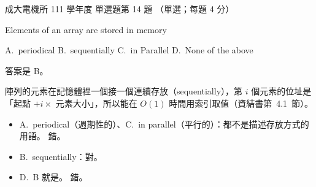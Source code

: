 \begin{pastexam}[label={px:ncku-111-ee-ds-14}]{成大電機所 111 學年度 單選題第 14 題}
（單選；每題 4 分）

Elements of an array are stored \underline{\hspace{3em}} in memory

A.~periodical \qquad B.~sequentially \qquad C.~in Parallel \qquad D.~None of the above
\end{pastexam}

\begin{pastsoln}
答案是 B。

陣列的元素在記憶體裡一個接一個連續存放（sequentially），第 $i$ 個元素的位址是「起點 $+ i \times$ 元素大小」，所以能在 $O(1)$
時間用索引取值（資結書第~4.1~節）。
\begin{itemize}
\item A.~periodical（週期性的）、C.~in parallel（平行的）：都不是描述存放方式的用語。 錯。
\item B.~sequentially：對。
\item D.~B 就是。 錯。
\end{itemize}
\end{pastsoln}
